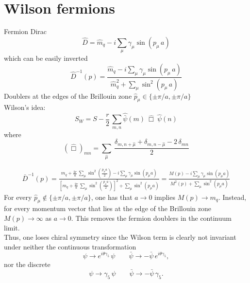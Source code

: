 \chapter{Wilson fermions}
\label{chap:AppendixB}
Fermion Dirac 
\begin{equation*}
    \widehat D = \hat m_q - i \sum_\mu \gamma_\mu \sin \left(p_\mu \, a\right)
\end{equation*}
which can be easily inverted
\begin{equation*}
    \widehat{D}^{-1}(p) = \frac{\hat m_q - i \sum_\mu \gamma_\mu \sin \left(p_\mu \, a\right)}{\hat m_q^2 + \sum_\mu \sin^2 \left(p_\mu \, a \right)}
\end{equation*}
Doublers at the edges of the Brillouin zone $\hat p_\mu \in \{\pm \pi/a, \pm \pi/a\}$ \\
Wilson's idea:
\begin{equation*}
    S_{W} = S - \frac{r}{2} \, \sum_{m,n} \hat{\bar\psi}(m) \ \hat\Box \ \hat{\psi}(n)
\end{equation*}
where 
\begin{equation*}
    \left(\hat\Box\right)_{mn} = \sum_{\hat\mu} \ \frac{\delta_{m, n+\hat\mu} + \delta_{m, n-\hat\mu} - 2 \, \delta_{mn}}{2}
\end{equation*}

\begin{equation*}
    \begin{aligned}
        \bar{D}^{-1}(p) = \frac{m_q + \frac{2r}{a} \, \sum_\mu \sin ^2\left(\frac{p_\mu a}{2}\right) - i \sum_\mu \gamma_\mu \sin \left(p_\mu a\right)}{\left[m_q + \frac{2r}{a} \, \sum_\mu \sin^2\left(\frac{p_\mu a}{2}\right)\right]^2 + \sum_\mu \sin^2 \left(p_\mu a\right)} = \frac{M(p) - i \sum_\mu \gamma_\mu \sin \left(p_\mu a\right)}{M^2(p) + \sum_\mu \sin^2 \left(p_\mu a\right)}
    \end{aligned}
\end{equation*}
For every $\hat p_\mu \not\in \{\pm \pi/a, \pm \pi/a\}$, one has that $a \to 0$ implies $M(p) \to m_q$. Instead, for every momentum vector that lies at the edge of the Brillouin zone $M(p) \to \infty$ as $a \to 0$. This removes the fermion doublers in the continuum limit. \\
Thus, one loses chiral symmetry since the Wilson term is clearly not invariant under neither the continuous transformation
\begin{equation*}
    \psi \to e^{i \theta \gamma_5} \, \psi \qquad \bar\psi \to - \bar\psi \, e^{i \theta \gamma_5},
\end{equation*}
nor the discrete
\begin{equation*}
    \psi \to \gamma_5 \, \psi \qquad \bar\psi \to - \bar\psi \, \gamma_5.
\end{equation*}